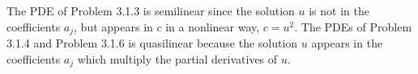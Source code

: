 \begin{questions}


\begin{solution}
The PDE of Problem 3.1.3 is semilinear since the solution $u$ is not in the coefficients $a_j$, but appears in $c$ in a nonlinear way, $c=u^2$.
The PDEs of Problem 3.1.4 and Problem 3.1.6 is quasilinear because the solution $u$ appears in the coefficients $a_j$ which multiply the partial derivatives of $u$.
\end{solution}
\end{questions}